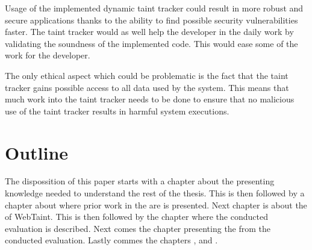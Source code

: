 Usage of the implemented dynamic taint tracker could result in more robust and secure applications thanks to the ability to find possible security vulnerabilities faster. The taint tracker would as well help the developer in the daily work by validating the soundness of the implemented code. This would ease some of the work for the developer.

The only ethical aspect which could be problematic is the fact that the taint tracker gains possible access to all data used by the system. This means that much work into the taint tracker needs to be done to ensure that no malicious use of the taint tracker results in harmful system executions.



\section{Outline}
\label{Outline}
The dispossition of this paper starts with a chapter about the \textit{} presenting knowledge needed to understand the rest of the thesis. This is then followed by a chapter about \textit{} where prior work in the are is presented. Next chapter is about the \textit{} of WebTaint. This is then followed by the \textit{} chapter where the conducted evaluation is described. Next comes the chapter presenting the \textit{} from the conducted evaluation. Lastly commes the chapters \textit{}, \textit{} and \textit{}.